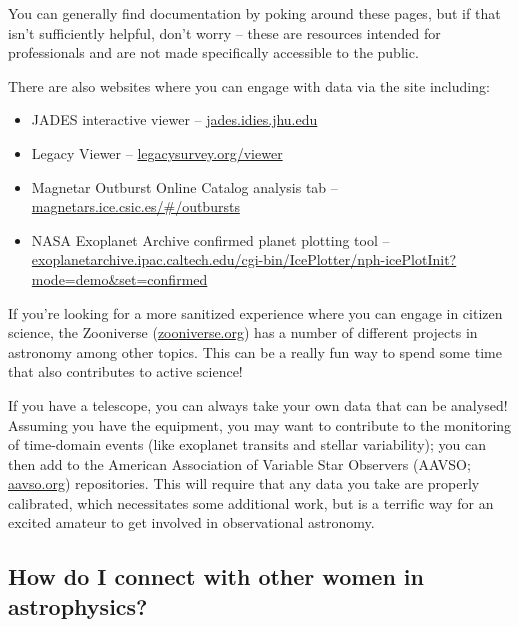 You can generally find documentation by poking around these pages, but if that isn't sufficiently helpful, don't worry -- these are resources intended for professionals and are not made specifically accessible to the public.

There are also websites where you can engage with data via the site including:
\begin{itemize}
    \item JADES interactive viewer -- \href{https://jades.idies.jhu.edu}{jades.idies.jhu.edu}
    \item Legacy Viewer -- \href{https://www.legacysurvey.org/viewer}{legacysurvey.org/viewer}
    \item Magnetar Outburst Online Catalog analysis tab -- \\\href{http://magnetars.ice.csic.es/#/outbursts}{magnetars.ice.csic.es/\#/outbursts}
    \item NASA Exoplanet Archive confirmed planet plotting tool -- \\\href{https://exoplanetarchive.ipac.caltech.edu/cgi-bin/IcePlotter/nph-icePlotInit?mode=demo&set=confirmed}{exoplanetarchive.ipac.caltech.edu/cgi-bin/IcePlotter/nph-icePlotInit?mode=demo\&set=confirmed}
    
\end{itemize}

If you're looking for a more sanitized experience where you can engage in citizen science, the Zooniverse (\href{https://www.zooniverse.org}{zooniverse.org}) has a number of different projects in astronomy among other topics. This can be a really fun way to spend some time that also contributes to active science!

If you have a telescope, you can always take your own data that can be analysed! Assuming you have the equipment, you may want to contribute to the monitoring of time-domain events (like exoplanet transits and stellar variability); you can then add to the American Association of Variable Star Observers (AAVSO; \href{https://www.aavso.org/}{aavso.org}) repositories. This will require that any data you take are properly calibrated, which necessitates some additional work, but is a terrific way for an excited amateur to get involved in observational astronomy.

\vspace{-1cm}

\subsection{How do I connect with other women in astrophysics?}

